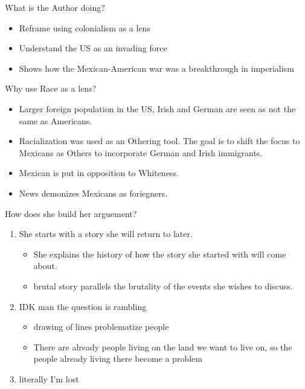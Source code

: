 \documentclass{report}
\begin{document}
\begin{description}
    \item What is the Author doing?
        \begin{itemize}
            \item Reframe using colonialism as a lens
            \item Understand the US as an invading force
            \item Shows how the Mexican-American war was
                a breakthrough in imperialism
        \end{itemize}
    \item Why use Race as a lens?
        \begin{itemize}
            \item Larger foreign population in the US,
                Irish and German are seen as not
                the same as Americans. 
            \item Racialization was used as an Othering tool.
                The goal is to shift the focus to Mexicans
                as Others to incorporate German and Irish
                immigrants.
            \item Mexican is put in opposition to Whiteness.
            \item News demonizes Mexicans as foriegners.
        \end{itemize}
    \item How does she build her arguement?
        \begin{enumerate}
            \item She starts with a story she will return to
                later.
                \begin{itemize}
                    \item She explains the history of how the
                        story she started with will come about.
                    \item brutal story parallels the brutality
                        of the events she wishes to discuss.
                \end{itemize}
            \item IDK man the question is rambling
                \begin{itemize}
                    \item drawing of lines problematize
                        people
                    \item There are already people living on
                        the land we want to live on,
                        so the people already living there
                        become a problem
                \end{itemize}
            \item literally I'm lost 
        \end{enumerate}
\end{description}
\end{document}
